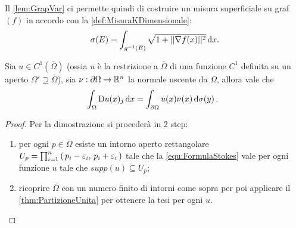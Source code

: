 Il \cref{lem:GrapVar} ci permette quindi di costruire un misura superficiale su graf$(f)$ in accordo con la \cref{def:MisuraKDimensionale}:
\[
	\sigma(E)=\int_{g^{-1}(E)} \sqrt{1+||\nabla f(x)||^2} \,\mathrm d x.
\]


\begin{proposition}\label{prop:FormulaStokes}
	Sia $u\in C^1(\bar \Omega)$ (ossia $u$ è la restrizione a $\bar \Omega$ di una funzione $C^1$ definita su un aperto
	$\Omega'\supseteq \bar \Omega$), sia $\nu:\partial \Omega \rightarrow \mathbb R^n$ la normale uscente da $\Omega$, allora vale che
	\begin{equation}\label{equ:FormulaStokes}
		\int_{\Omega} \mathrm D u(x)_j \,\mathrm d x = \int_{\partial \Omega} u(x)\nu(x) \,\mathrm d \sigma(y)\, \text{. }
	\end{equation}
\end{proposition}

\begin{proof}
	Per la dimostrazione si procederà in 2 step:
	\begin{enumerate}
		\item per ogni $p\in \bar \Omega$ esiste un intorno aperto rettangolare $U_p=\prod_{i=1}^n \left(\,p_i-\varepsilon_i,\,p_i+\varepsilon_i\,\right)$
			tale che la \cref{equ:FormulaStokes} vale per ogni funzione $u$ tale che $supp(u)\subseteq U_p$;
		\item ricoprire $\bar \Omega$ con un numero finito di intorni come sopra per poi applicare il \cref{thm:PartizioneUnita} per ottenere
			la tesi per ogni $u$.
	\end{enumerate}

\end{proof}

